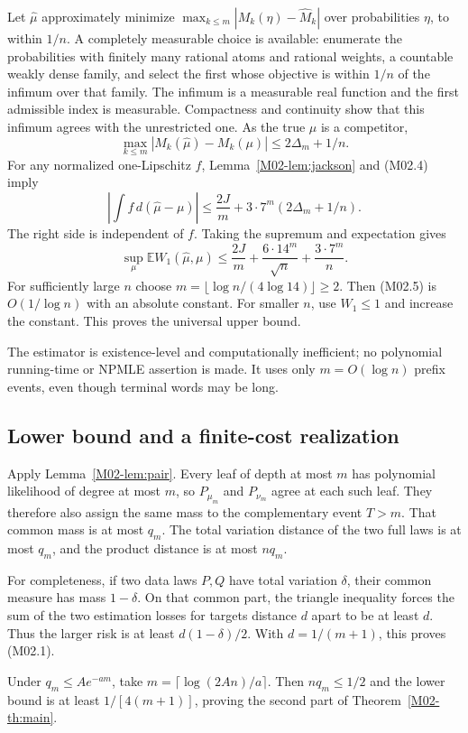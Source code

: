 \documentclass[11pt,a4paper]{article}
\theoremstyle{definition}\newtheorem{definition}[theorem]{Definition}
\theoremstyle{remark}\newtheorem{remark}[theorem]{Remark}
\newcommand{\E}{\mathbb E}\newcommand{\one}{\mathbf 1}\newcommand{\1}{\mathbf 1}
\numberwithin{equation}{section}
\begin{document}
Let $\widehat\mu$ approximately minimize
$\max_{k\le m}|M_k(\eta)-\widehat M_k|$ over probabilities $\eta$, to within $1/n$. A completely measurable choice is available: enumerate the probabilities with finitely many rational atoms and rational weights, a countable weakly dense family, and select the first whose objective is within $1/n$ of the infimum over that family. The infimum is a measurable real function and the first admissible index is measurable. Compactness and continuity show that this infimum agrees with the unrestricted one. As the true $\mu$ is a competitor,
\[
 \max_{k\le m}|M_k(\widehat\mu)-M_k(\mu)|\le2\Delta_m+1/n.\tag{M02.4}
\]
For any normalized one-Lipschitz $f$, Lemma~\ref{M02-lem:jackson} and (M02.4) imply
\[
 \left|\int f\,d(\widehat\mu-\mu)\right|
 \le\frac{2J}{m}+3\cdot7^m(2\Delta_m+1/n).
\]
The right side is independent of $f$. Taking the supremum and expectation gives
\[
 \sup_\mu\E W_1(\widehat\mu,\mu)
 \le\frac{2J}{m}+\frac{6\cdot14^m}{\sqrt n}
       +\frac{3\cdot7^m}{n}.\tag{M02.5}
\]
For sufficiently large $n$ choose $m=\lfloor\log n/(4\log14)\rfloor\ge2$. Then (M02.5) is $O(1/\log n)$ with an absolute constant. For smaller $n$, use $W_1\le1$ and increase the constant. This proves the universal upper bound.

The estimator is existence-level and computationally inefficient; no polynomial running-time or NPMLE assertion is made. It uses only $m=O(\log n)$ prefix events, even though terminal words may be long.

\subsection{Lower bound and a finite-cost realization}\label{M02-sec-4}
Apply Lemma~\ref{M02-lem:pair}. Every leaf of depth at most $m$ has polynomial likelihood of degree at most $m$, so $P_{\mu_m}$ and $P_{\nu_m}$ agree at each such leaf. They therefore also assign the same mass to the complementary event $T>m$. That common mass is at most $q_m$. The total variation distance of the two full laws is at most $q_m$, and the product distance is at most $nq_m$.

For completeness, if two data laws $P,Q$ have total variation $\delta$, their common measure has mass $1-\delta$. On that common part, the triangle inequality forces the sum of the two estimation losses for targets distance $d$ apart to be at least $d$. Thus the larger risk is at least $d(1-\delta)/2$. With $d=1/(m+1)$, this proves (M02.1).

Under $q_m\le Ae^{-am}$, take $m=\lceil\log(2An)/a\rceil$. Then $nq_m\le1/2$ and the lower bound is at least $1/[4(m+1)]$, proving the second part of Theorem~\ref{M02-th:main}.
\end{document}
